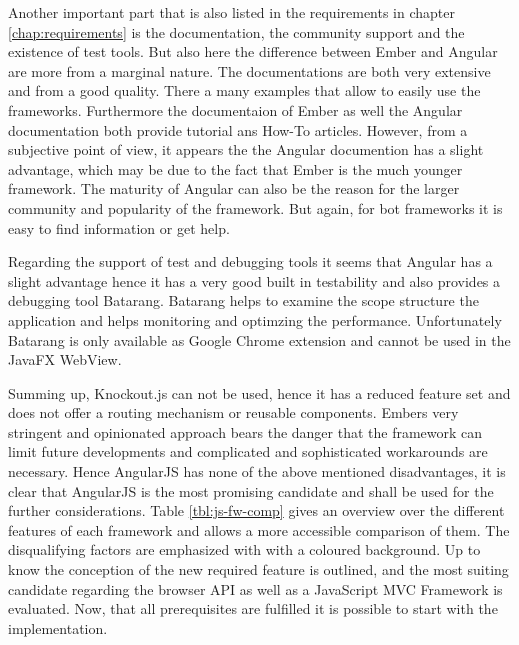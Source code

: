Another important part that is also listed in the requirements in chapter \ref{chap:requirements} is the documentation, the community support and the existence of test tools. 
But also here the difference between Ember and Angular are more from a marginal nature. 
The documentations are both very extensive and from a good quality. 
There a many examples that allow to easily use the frameworks. 
Furthermore the documentaion of  Ember as well the Angular documentation both provide tutorial ans How-To articles. 
However, from a subjective point of view, it appears the the Angular documention has a slight advantage, which may be due to the fact that Ember is the much younger framework. 
The maturity of Angular can also be the reason for the larger community and popularity of the framework. 
But again, for bot frameworks it is easy to find information or get help. 

Regarding the support of test and debugging tools it seems that Angular has a slight advantage hence it has a very good built in testability and also provides a debugging tool Batarang. Batarang helps to examine the scope structure the application and helps monitoring and optimzing the performance. Unfortunately Batarang is only available as Google Chrome extension and cannot be used in the JavaFX WebView.

Summing up, Knockout.js can not be used, hence it has a reduced feature set and does not offer a routing mechanism or reusable components. Embers very stringent and opinionated approach bears the danger that the framework can limit future developments and complicated and sophisticated workarounds are necessary. Hence AngularJS has none of the above mentioned disadvantages, it is clear that AngularJS is the most promising candidate and shall be used for the further considerations. Table \ref{tbl:js-fw-comp} gives an overview over the different features of each framework and allows a more accessible comparison of them. The disqualifying factors are emphasized with with a coloured background. Up to know the conception of the new required feature is outlined, and the most suiting candidate regarding the browser API as well as a JavaScript MVC Framework is evaluated. Now, that all prerequisites are fulfilled it is possible to start with the implementation.



